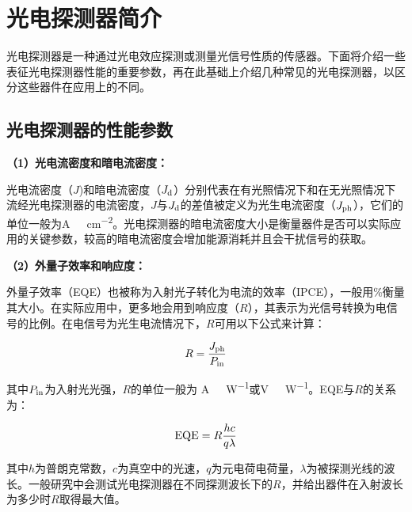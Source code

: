 \documentclass[forlib]{WHUMaster}   %
\begin{document}
{\section{光电探测器简介}

光电探测器是一种通过光电效应探测或测量光信号性质的传感器。下面将介绍一些表征光电探测器性能的重要参数，再在此基础上介绍几种常见的光电探测器，以区分这些器件在应用上的不同。

\subsection{光电探测器的性能参数}%

\textbf{（1）光电流密度和暗电流密度：}

光电流密度（$J$)和暗电流密度（$J_{\rm{d}}$）分别代表在有光照情况下和在无光照情况下流经光电探测器的电流密度，$J$与$J_{\rm{d}}$的差值被定义为光生电流密度（$J_{\rm{ph}}$）\cite{RN73,RN74,RN75}，它们的单位一般为\si{A\ cm^{-2}}。光电探测器的暗电流密度大小是衡量器件是否可以实际应用的关键参数，较高的暗电流密度会增加能源消耗并且会干扰信号的获取。

\textbf{（2）外量子效率和响应度：}

外量子效率（EQE）也被称为入射光子转化为电流的效率（IPCE）\cite{RN75}，一般用\%衡量其大小。在实际应用中，更多地会用到响应度（$R$），其表示为光信号转换为电信号的比例。在电信号为光生电流情况下，$R$可用以下公式来计算：

\begin{equation}\label{eq-1.3.1}
R = \frac{J_{\rm{ph}}}{P_{\rm{in}}}
\end{equation}

其中$P_{\rm{in}}$为入射光光强，$R$的单位一般为 \si{A\ W^{-1}}或\si{V\ W^{-1}}。EQE与$R$的关系为：

\begin{equation}\label{eq-1.3.2}
{\rm{EQE} } = R \frac{hc}{q\lambda}
\end{equation}

其中$h$为普朗克常数，$c$为真空中的光速，$q$为元电荷电荷量，$\lambda$为被探测光线的波长。一般研究中会测试光电探测器在不同探测波长下的$R$，并给出器件在入射波长为多少时$R$取得最大值。


}
\end{document}

